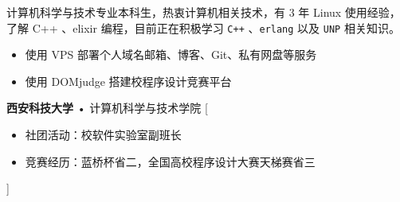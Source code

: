 \documentclass[zh]{resume}
\begin{document}
\makeheader

{\onehalfspacing\hspace{2em}%
计算机科学与技术专业本科生，热衷计算机相关技术，有 3 年 Linux 使用经验，了解 C++ 、elixir 编程，目前正在积极学习 \texttt{C++} 、\texttt{erlang} 以及 \texttt{UNP} 相关知识。
\par}

\begin{competences}
\end{competences}

\begin{itemize}
  \item {使用 VPS 部署个人域名邮箱、博客、Git、私有网盘等服务}
  \item {使用 DOMjudge 搭建校程序设计竞赛平台}
\end{itemize}

\begin{experiences}
  {\textbf{西安科技大学} • 计算机科学与技术学院}%
  [\begin{itemize}
     \item {社团活动：校软件实验室副班⻓}
     \item {竞赛经历：蓝桥杯省二，全国高校程序设计大赛天梯赛省三}
   \end{itemize}]
\end{experiences}
\end{document}
